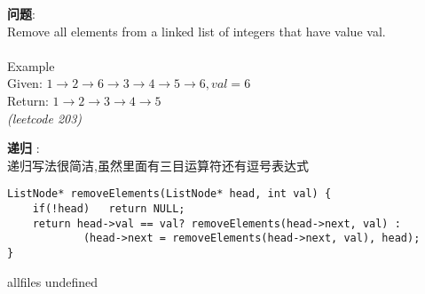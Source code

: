 \documentclass{article}
\begin{document}
\begin{CJK}{UTF8}{gbsn}     %

\else
    
\begin{description}
    \item{\textbf{问题}}: \\
Remove all elements from a linked list of integers that have value val. \\
\\
Example \\
Given: $1 \rightarrow 2 \rightarrow 6 \rightarrow 3 \rightarrow 4 \rightarrow 5 \rightarrow 6, val = 6$ \\
Return: $1 \rightarrow 2 \rightarrow 3 \rightarrow 4 \rightarrow 5$ \\
 \textit{(leetcode 203)}
    \item{\textbf{递归}} : 
    \\递归写法很简洁,虽然里面有三目运算符还有逗号表达式
    \begin{lstlisting}
ListNode* removeElements(ListNode* head, int val) {
	if(!head)	return NULL;
	return head->val == val? removeElements(head->next, val) :
			(head->next = removeElements(head->next, val), head);
}
    \end{lstlisting}
\end{description}

\fi

\ifx allfiles undefined
\end{CJK}
\end{document}
